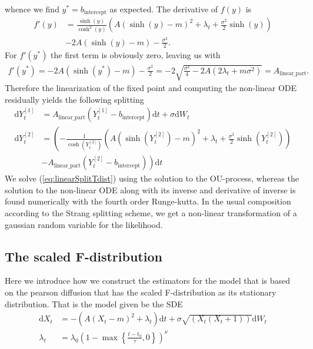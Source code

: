 whence we find $y^* = b_{\mathrm{intercept}}$ as expected. The derivative of $f(y)$ is
\begin{align}
    f'(y) &= \frac{\sinh(y)}{\cosh^2(y)}\left(A\left(\sinh(y) - m\right)^2 + \lambda_t + \frac{\sigma^2}{2}\sinh(y)\right) \nonumber \\
    &- 2A\left(\sinh(y) - m\right) - \frac{\sigma^2}{2}.
\end{align}
For $f'(y^*)$ the first term is obviously zero, leaving us with
\begin{align}
    f'(y^*) = -2A\left(\sinh(y^*) - m\right) - \frac{\sigma^2}{2} = -2\sqrt{\frac{\sigma^4}{4} - 2A\left(2\lambda_t + m\sigma^2\right)} = A_{\mathrm{linear\_part}}.
\end{align}
Therefore the linearization of the fixed point and computing the non-linear ODE residually yields the following splitting
\begin{align}
    \mathrm{d}Y_t^{[1]} &= A_{\textrm{linear\_part}}\left(Y_t^{[1]} - b_{\textrm{intercept}}\right)\mathrm{d}t + \sigma \mathrm{d}W_t \label{eq:linearSplitTdist} \\
    \mathrm{d}Y_t^{[2]} &= \left(-\frac{1}{\cosh(Y_t^{[2]})}\left(A\left(\sinh(Y_t^{[2]}) - m\right)^2 + \lambda_t + \frac{\sigma^2}{2}\sinh(Y_t^{[2]})\right)\right.\\
     &\left.- A_{\textrm{linear\_part}}\left(Y_t^{[2]} - b_{\textrm{intercept}}\right)\right)\mathrm{d}t \label{eq:StrangTDiffusionDynamic}
\end{align}
We solve (\ref{eq:linearSplitTdist}) using the solution to the OU-process, whereas the solution to the non-linear ODE along with its inverse and derivative of inverse is found numerically with the fourth order Runge-kutta. In the usual composition according to the Strang splitting scheme, we get a non-linear transformation of a gaussian random variable for the likelihood.
\subsection{The scaled F-distribution}
Here we introduce how we construct the estimators for the model that is based on the pearson diffusion that has the scaled F-distribution as its stationary distribution. That is the model given be the SDE
\begin{align}
    \mathrm{d}X_t &= -\left(A\left(X_t - m\right)^2 + \lambda_t\right)\mathrm{d}t + \sigma \sqrt{\left(X_t\left(X_t + 1\right)\right)} \mathrm{d}W_t\\
    \lambda_t &= \lambda_0\left(1 - \max\left\{\frac{t - t_0}{\tau}, 0\right\}\right)^\nu
\end{align}
